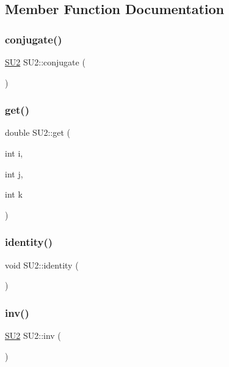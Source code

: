 \subsection{Member Function Documentation}
\mbox{\label{class_s_u2_afb3a5fc8c00a45a0044113fb742727cc}} 
\subsubsection{\texorpdfstring{conjugate()}{conjugate()}}
{\footnotesize\ttfamily \mbox{\hyperlink{class_s_u2}{S\+U2}} S\+U2\+::conjugate (\begin{DoxyParamCaption}{ }\end{DoxyParamCaption})}

\mbox{\label{class_s_u2_a4f10c4617e00686b196653dd669e0697}} 
\subsubsection{\texorpdfstring{get()}{get()}}
{\footnotesize\ttfamily double S\+U2\+::get (\begin{DoxyParamCaption}\item[{int}]{i,  }\item[{int}]{j,  }\item[{int}]{k }\end{DoxyParamCaption})\hspace{0.3cm}{\ttfamily [inline]}}

\mbox{\label{class_s_u2_a17ce46d1d9db179d045602b90b3d5af4}} 
\subsubsection{\texorpdfstring{identity()}{identity()}}
{\footnotesize\ttfamily void S\+U2\+::identity (\begin{DoxyParamCaption}{ }\end{DoxyParamCaption})\hspace{0.3cm}{\ttfamily [inline]}}

\mbox{\label{class_s_u2_a2f7f6ade28078418c8ee97234fff4dd0}} 
\subsubsection{\texorpdfstring{inv()}{inv()}}
{\footnotesize\ttfamily \mbox{\hyperlink{class_s_u2}{S\+U2}} S\+U2\+::inv (\begin{DoxyParamCaption}{ }\end{DoxyParamCaption})\hspace{0.3cm}{\ttfamily [inline]}}

